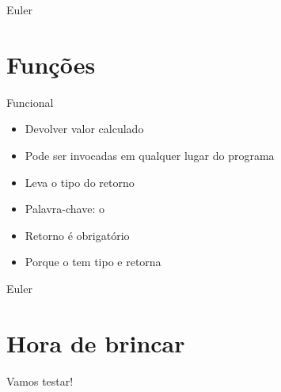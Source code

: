 \documentclass[14pt]{beamer}
\begin{document}
		\begin{frame}{Euler}
			\presentationPause
		\end{frame}


	\section{Funções}
		\begin{frame}{Funcional}
			\begin{itemize}
				\presentationPause\item Devolver valor calculado
				\presentationPause\item Pode ser invocadas em qualquer lugar do programa
				\presentationPause\item Leva o tipo do retorno
				\presentationPause\item Palavra-chave: \presentationPause o 
				\presentationPause\item Retorno é obrigatório
				\presentationPause\item Porque o  tem tipo  e retorna 
			\end{itemize}
			\presentationPause
		\end{frame}

		\begin{frame}{Euler}
			\presentationPause
		\end{frame}


	\section{Hora de brincar}
		\begin{frame}
			\begin{center}\Huge
				Vamos testar!
			\end{center}
		\end{frame}
\end{document}
